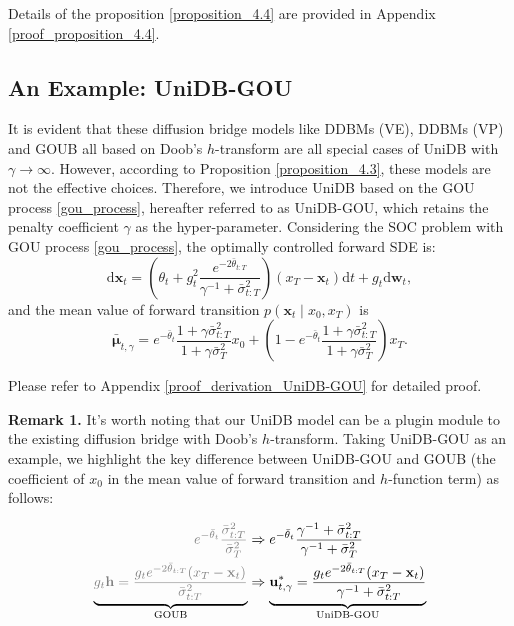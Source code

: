 Details of the proposition \ref{proposition_4.4} are provided in Appendix \ref{proof_proposition_4.4}. 

\subsection{An Example: UniDB-GOU}\label{example}
It is evident that these diffusion bridge models like DDBMs (VE), DDBMs (VP) and GOUB all based on Doob's $h$-transform are all special cases of UniDB with $\gamma \rightarrow \infty$. However, according to Proposition \ref{proposition_4.3}, these models are not the effective choices. Therefore, we introduce UniDB based on the GOU process \eqref{gou_process}, hereafter referred to as UniDB-GOU, which retains the penalty coefficient $\gamma$ as the hyper-parameter. Considering the SOC problem with GOU process \eqref{gou_process}, the optimally controlled forward SDE is:
\begin{equation}\label{20}
\mathrm{d} \mathbf{x}_t = \left( \theta_t + g^2_t \frac{e^{-2\bar{\theta}_{t:T}}}{\gamma^{-1} + \bar{\sigma}^2_{t:T}}\right) (x_T - \mathbf{x}_t) \mathrm{d} t + g_t \mathrm{d} \mathbf{w}_t,
\end{equation}
and the mean value of forward transition $p(\mathbf{x}_t \mid x_0, x_T)$ is
\begin{equation}\label{21}
\bar{\boldsymbol{\mu}}_{t, \gamma} = e^{-\bar{\theta}_{t}} \frac{1 + \gamma \bar{\sigma}^2_{t:T}}{1 + \gamma \bar{\sigma}^2_{T}} x_0 + \left(1 - e^{-\bar{\theta}_{t}} \frac{1 + \gamma \bar{\sigma}^2_{t:T}}{1 + \gamma \bar{\sigma}^2_{T}}\right) x_T.
\end{equation}

Please refer to Appendix \ref{proof_derivation_UniDB-GOU} for detailed proof. 

\textbf{Remark 1.} It’s worth noting that our UniDB model can be a plugin module to the existing diffusion bridge with Doob's $h$-transform. Taking UniDB-GOU as an example, we highlight the key difference between UniDB-GOU and GOUB (the coefficient of $x_0$ in the mean value of forward transition and $h$-function term) as follows:


\begin{equation}
\begin{aligned}
\textcolor{gray} {e^{-\bar{\theta}_{t}} \frac{\bar{\sigma}^2_{t:T}}{\bar{\sigma}^2_{T}}} & \Rightarrow e^{-\bar{\theta}_{t}} \frac{\gamma^{-1} + \bar{\sigma}^2_{t:T}}{\gamma^{-1} + \bar{\sigma}^2_{T}} \\
\underbrace{\textcolor{gray} {g_t\mathbf{h} = \frac{g_t e^{-2\bar{\theta}_{t:T}}(x_T - \mathbf{x}_t)}{\bar{\sigma}^2_{t:T}}}}_{\text{GOUB}} & \Rightarrow \underbrace{ \mathbf{u}_{t, \gamma}^{*} = \frac{g_t e^{-2\bar{\theta}_{t:T}}(x_T - \mathbf{x}_t)}{\gamma^{-1} + \bar{\sigma}^2_{t:T}}}_{\text{UniDB-GOU}}
\end{aligned}
\end{equation}


